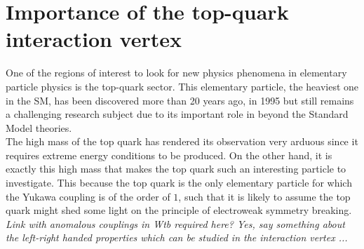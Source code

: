 \section{Importance of the top-quark interaction vertex} \label{sec::TopQuarkPhysics}
One of the regions of interest to look for new physics phenomena in elementary particle physics is the top-quark sector. This elementary particle, the heaviest one in the SM, has been discovered more than 20 years ago, in 1995 but still remains a challenging research subject due to its important role in beyond the Standard Model theories. 
\\
The high mass of the top quark has rendered its observation very arduous since it requires extreme energy conditions to be produced. 
On the other hand, it is exactly this high mass that makes the top quark such an interesting particle to investigate.
This because the top quark is the only elementary particle for which the Yukawa coupling is of the order of $1$, such that it is likely to assume the top quark might shed some light on the principle of electroweak symmetry breaking.
\\
\textit{Link with anomalous couplings in Wtb required here? Yes, say something about the left-right handed properties which can be studied in the interaction vertex ...}
%

